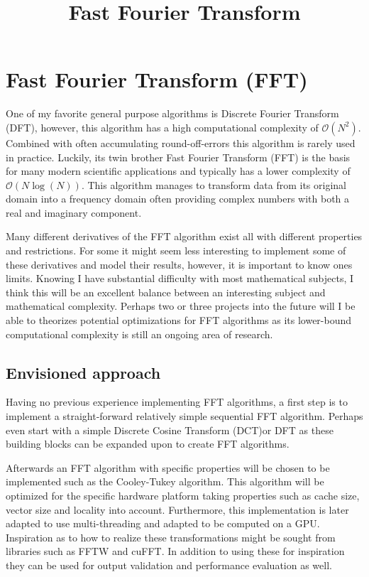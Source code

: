 \documentclass[conference]{IEEEtran}
\title{Fast Fourier Transform%
}
\begin{document}
\section{Fast Fourier Transform (FFT)}
One of my favorite general purpose algorithms is Discrete Fourier Transform
(DFT), however, this algorithm has a high computational complexity of
$\mathcal{O}(N^2)$. Combined with often accumulating round-off-errors this algorithm
is rarely used in practice. Luckily, its twin brother Fast Fourier Transform
(FFT) is the basis for many modern scientific applications and typically has a
lower complexity of $\mathcal{O}(N\log(N))$. This algorithm manages to transform
data from its original domain into a frequency domain often providing complex
numbers with both a real and imaginary component\footnotemark[1].


Many different derivatives of the FFT algorithm exist all with different
properties and restrictions. For some it might seem less interesting to
implement some of these derivatives and model their results, however, it is
important to know ones limits. Knowing I have substantial difficulty with most
mathematical subjects, I think this will be an excellent balance between an
interesting subject and mathematical complexity. Perhaps two or three projects
into the future will I be able to theorizes potential optimizations for FFT
algorithms as its lower-bound computational complexity is still an ongoing
area of research.

\subsection{Envisioned approach}
Having no previous experience implementing FFT algorithms, a first step is to
implement a straight-forward relatively simple sequential FFT algorithm. Perhaps
even start with a simple Discrete Cosine Transform (DCT)\footnotemark[2] or DFT
as these building blocks can be expanded upon to create FFT algorithms.


Afterwards an FFT algorithm with specific properties will be chosen to
be implemented such as the Cooley-Tukey algorithm\cite{Cooley1965}. This
algorithm will be optimized for the specific hardware platform taking properties
such as cache size, vector size and locality into account. Furthermore, this
implementation is later adapted to use multi-threading and adapted to be
computed on a GPU. Inspiration as to how to realize these transformations might
be sought from libraries such as FFTW\cite{FFTW} and cuFFT\cite{cufft}. In
addition to using these for inspiration they can be used for output validation
and performance evaluation as well.



\end{document}
